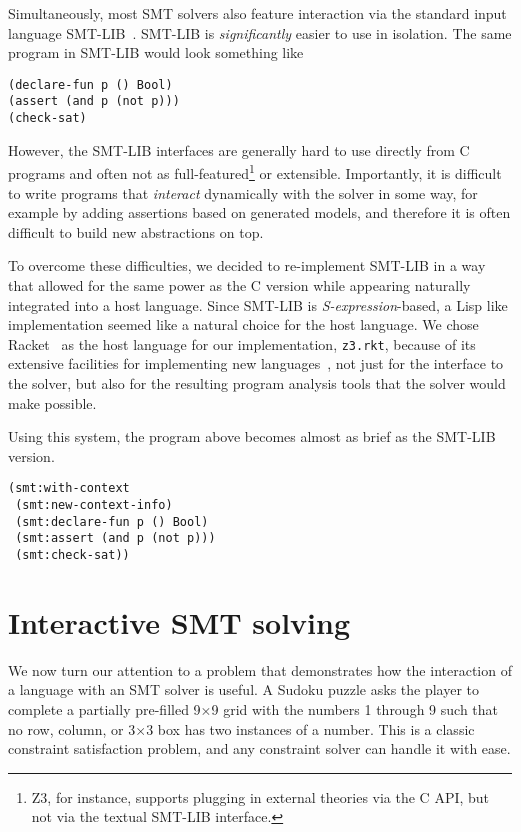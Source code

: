 Simultaneously, most SMT solvers also feature interaction via the standard input
language SMT-LIB~\cite{smtlib2:10}. SMT-LIB is \textit{significantly} easier to
use in isolation. The same program in SMT-LIB would look something like

\begin{verbatim}
(declare-fun p () Bool)
(assert (and p (not p)))
(check-sat)
\end{verbatim}

However, the SMT-LIB interfaces are generally hard to use directly from C
programs and often not as full-featured\footnote{Z3, for instance, supports
  plugging in external theories via the C API, but not via the textual SMT-LIB
  interface.}  or extensible. Importantly, it is difficult to write programs
that \textit{interact} dynamically with the solver in some way, for example by
adding assertions based on generated models, and therefore it is often difficult
to build new abstractions on top.

To overcome these difficulties, we decided to re-implement SMT-LIB in a way that
allowed for the same power as the C version while appearing naturally integrated
into a host language. Since SMT-LIB is {\em
  S-expression}-based, a Lisp like implementation seemed like a
natural choice for the host language. We chose Racket~\cite{racket} as the host
language for our implementation, \texttt{z3.rkt}, because of its extensive
facilities for implementing new languages~\cite{Tobin-Hochstadt:11}, not just
for the interface to the solver, but also for the resulting program analysis
tools that the solver would make possible.

Using this system, the program above becomes almost as brief as the SMT-LIB
version.

\begin{verbatim}
(smt:with-context
 (smt:new-context-info)
 (smt:declare-fun p () Bool)
 (smt:assert (and p (not p)))
 (smt:check-sat))
\end{verbatim}

\section{Interactive SMT solving}

We now turn our attention to a problem that demonstrates how the interaction of
a language with an SMT solver is useful. A Sudoku puzzle asks the player to
complete a partially pre-filled 9$\times$9 grid with the numbers 1 through 9
such that no row, column, or 3$\times$3 box has two instances of a number. This
is a classic constraint satisfaction problem, and any constraint solver can
handle it with ease.

